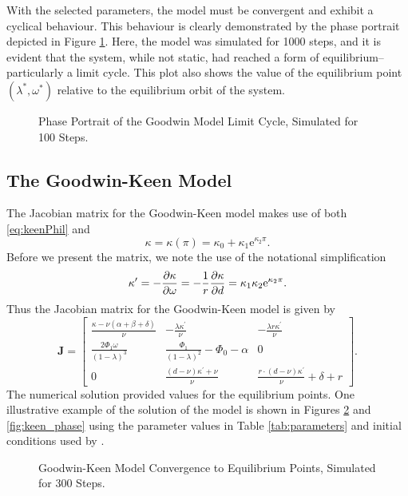 \documentclass[12pt, centerh1]{article}
\begin{document}
\noindent With the selected parameters, the model must be convergent and exhibit a cyclical behaviour. This behaviour is clearly demonstrated by the phase portrait depicted in Figure \ref{fig:goodwin_phase}. Here, the model was simulated for 1000 steps, and it is evident that the system, while not static, had reached a form of equilibrium--particularly a limit cycle. This plot also shows the value of the equilibrium point $(\lambda^\ast, \omega^\ast)$ relative to the equilibrium orbit of the system.
\begin{figure}[H]
    \centering
    
    \caption{Phase Portrait of the Goodwin Model Limit Cycle, Simulated for 100 Steps.}
    \label{fig:goodwin_phase}
\end{figure}

\subsection{The Goodwin-Keen Model}
The Jacobian matrix for the Goodwin-Keen model makes use of both \eqref{eq:keenPhil} and 
\begin{equation*} \label{eq:keenKappa}
    \kappa=\kappa(\pi) = \kappa_0 + \kappa_1\mathrm e^{\kappa_2\pi}.
\end{equation*}
Before we present the matrix, we note the use of the notational simplification
\begin{equation*}
    \kappa^\prime = -\pdv{\kappa}{\omega} = -\frac{1}{r}\pdv{\kappa}{d} = \kappa_1\kappa_2\mathrm e^{\kappa_2\pi}.
\end{equation*}
Thus the Jacobian matrix for the Goodwin-Keen model is given by
\begin{equation} \label{eq:jac_keen}
    \mathbf J = %
    \begin{bmatrix}
        \frac{\kappa-\nu(\alpha+\beta+\delta)}{\nu} & -\frac{\lambda\kappa^\prime}{\nu} & -\frac{\lambda r\kappa^\prime}{\nu} \\[0.5em]
        \frac{2\Phi_1\omega}{(1-\lambda)^3} & \frac{\Phi_1}{(1-\lambda)^2}-\Phi_0-\alpha & 0\\[0.5em]
        0 & \frac{(d-\nu)\kappa^\prime+\nu}{\nu} & \frac{r\cdot(d-\nu)\kappa^\prime}{\nu}+ \delta + r
    \end{bmatrix}.
\end{equation}
The numerical solution provided values for the equilibrium points. One illustrative example of the solution of the model is shown in Figures \ref{fig:keen} and \ref{fig:keen_phase} using the parameter values in Table \ref{tab:parameters} and initial conditions used by \citet{grasselli2012analysis}.
\begin{figure}[H]
    \centering
    
    \caption{Goodwin-Keen Model Convergence to Equilibrium Points, Simulated for 300 Steps.}
    \label{fig:keen}
\end{figure}
\end{document}
